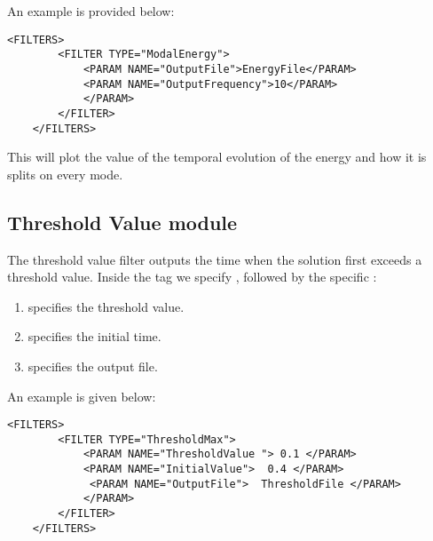 An example is provided below:

\begin{lstlisting}[style=XMLStyle]
    <FILTERS>
        <FILTER TYPE="ModalEnergy">
            <PARAM NAME="OutputFile">EnergyFile</PARAM>
            <PARAM NAME="OutputFrequency">10</PARAM>
            </PARAM>
        </FILTER>
    </FILTERS>
 \end{lstlisting}



This will plot the value of the temporal evolution of the energy and how it is splits on  every mode. 

\subsection {Threshold Value module}

The threshold value filter outputs the time when the solution first exceeds a threshold value.  Inside the  tag we specify , followed by the specific :

 \begin{enumerate}
\item {} specifies the threshold value.
 \item {} specifies the initial time.
 \item {} specifies the output file.
 \end{enumerate}
 
 An example is given below:
 
 \begin{lstlisting}[style=XMLStyle]
    <FILTERS>
        <FILTER TYPE="ThresholdMax">
            <PARAM NAME="ThresholdValue "> 0.1 </PARAM>
            <PARAM NAME="InitialValue">  0.4 </PARAM>
             <PARAM NAME="OutputFile">  ThresholdFile </PARAM>
            </PARAM>
        </FILTER>
    </FILTERS>
 \end{lstlisting}
 

